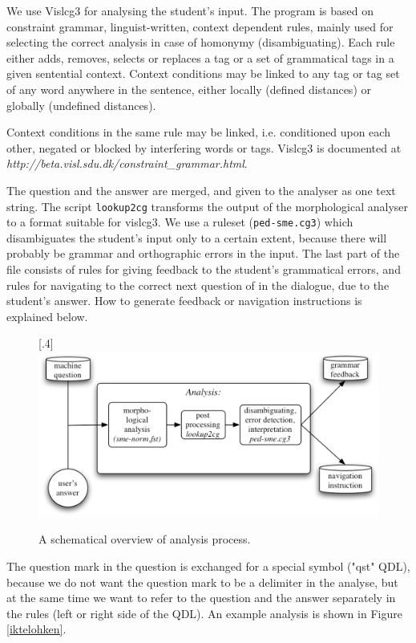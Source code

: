 \documentclass[a4paper,12pt]{article}
\begin{document}
We use Vislcg3 for analysing the student's input. The program is based on constraint grammar, linguist-written, context dependent rules, mainly used for selecting the correct analysis in case of homonymy (disambiguating). Each rule either adds, removes, selects or replaces a tag or a set of grammatical tags in a given sentential context. Context conditions may be linked to any tag or tag set of any word anywhere in the sentence, either locally (defined distances) or globally (undefined distances). 

Context conditions in the same rule may be linked, i.e. conditioned upon each other, negated or blocked by interfering words or tags. Vislcg3 is documented at \textit{http://beta.visl.sdu.dk/constraint\_grammar.html}.

The question and the answer are merged, and given to the analyser as one text string. The script \texttt{lookup2cg} transforms the output of the morphological analyser to a format suitable for vislcg3. We use a ruleset (\texttt{ped-sme.cg3}) which disambiguates the student's input only to a certain extent, because there will probably be grammar and orthographic errors in the input. The last part of the file consists of rules for giving feedback to the student's grammatical errors, and rules for navigating to the correct next question of in the dialogue, due to the student's answer. How to generate feedback or navigation instructions is explained below.


\begin{figure}[htbp]
\begin{center}
\scalebox{.4}[.4]{\includegraphics{presentation/img/qa.pdf}}
\caption{A schematical overview of analysis process.}
\label{qasystem}
\end{center}
\end{figure}

The question mark in the question is exchanged for a special symbol ("qst" QDL), because we do not want the question mark to be a delimiter in the analyse, but at the same time we want to refer to the question and the answer separately in the rules (left or right side of the QDL). An example analysis is shown in Figure \ref{iktelohken}.
\end{document}
